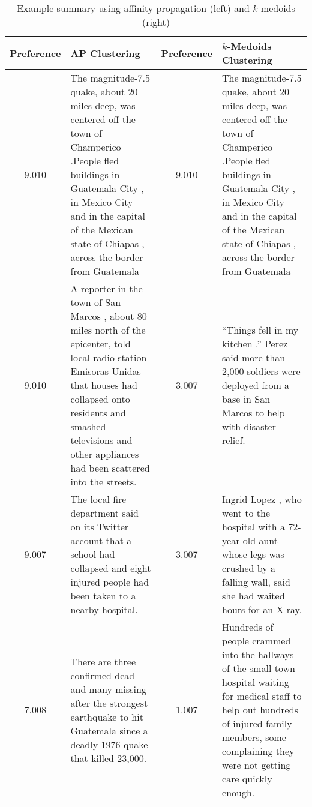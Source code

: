 \documentclass{sig-alternate} \usepackage{url} \usepackage{color}
\begin{document}

\begin{table*}[ht] \begin{center} \begin{tabular}{| c p{7.0cm} || c p{7.0cm}
|} \hline Preference & AP Clustering & Preference & $k$-Medoids Clustering\\
\hline 9.010 & The magnitude-7.5 quake, about 20 miles deep, was centered off
the town of Champerico .People fled buildings in Guatemala City , in Mexico
City and in the capital of the Mexican state of Chiapas , across the border
from Guatemala & 9.010 & The magnitude-7.5 quake, about 20 miles deep, was
centered off the town of Champerico .People fled buildings in Guatemala City ,
in Mexico City and in the capital of the Mexican state of Chiapas , across the
border from Guatemala   \\ \hline 9.010 & A reporter in the town of San Marcos
, about 80 miles north of the epicenter, told local radio station Emisoras
Unidas that houses had collapsed onto residents and smashed televisions and
other appliances had been scattered into the streets.  & 3.007 & ``Things fell
in my kitchen .'' Perez said more than 2,000 soldiers were deployed from a
base in San Marcos to help with disaster relief.\\ \hline 9.007 & The local
fire department said on its Twitter account that a school had collapsed and
eight injured people had been taken to a nearby hospital.  & 3.007 &  Ingrid
Lopez , who went to the hospital with a 72-year-old aunt whose legs was
crushed by a falling wall, said she had waited hours for an X-ray.\\ \hline
7.008 & There are three confirmed dead and many missing after the strongest
earthquake to hit Guatemala since a deadly 1976 quake that killed 23,000.  &
1.007 & Hundreds of people crammed into the hallways of the small town
hospital waiting for medical staff to help out hundreds of injured family
members, some complaining they were not getting care quickly enough. \\ \hline
\end{tabular} \end{center} \caption{Example summary using affinity propagation
(left) and $k$-medoids (right)} \end{table*} \begin{table*}[t] \begin{center}

\end{center}
\end{table*}
\end{document}
